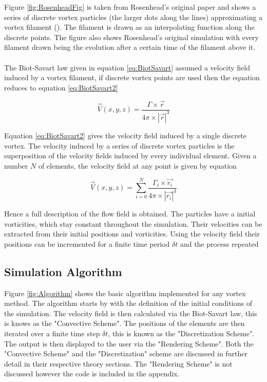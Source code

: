 Figure \ref{fig:RosenheadFig} is taken from Rosenhead's original paper and shows a series of discrete vortex particles (the larger dots along the lines) approximating a vortex filament (\cite{rosenhead_1931}). The filament is drawn as an interpolating function along the discrete points. The figure also shows Rosenhead's original simulation with every filament drawn being the evolution after a certain time of the filament above it. 
\\\\
The Biot-Savart law given in equation \ref{eq:BiotSavart} assumed a velocity field induced by a vortex filament, if discrete vortex points are used then the equation reduces to equation \ref{eq:BiotSavart2}

\begin{equation}
\label{eq:BiotSavart2}
\vec{V}(x,y,z)=\frac{\Gamma \times \vec{r}}{4\pi \times |\vec{r}|^3} 
\end{equation}

Equation \ref{eq:BiotSavart2} gives the velocity field induced by a single discrete vortex. The velocity induced by a series of discrete vortex particles is the superposition of the velocity fields induced by every individual element. Given a number $N$ of elements, the velocity field at any point is given by equation 

\begin{equation}
\label{eq:BiotSavart3}
\vec{V}(x,y,z)=\sum_{i=0}^{N}\frac{\Gamma_i \times \vec{r_i}}{4\pi \times |\vec{r_i}|^3} 
\end{equation}

Hence a full description of the flow field is obtained. The particles have a initial vorticities, which stay constant throughout the simulation. Their velocities can be extracted from their initial positions and vorticities. Using the velocity field their positions can be incremented for a finite time period $\delta t$ and the process repeated

\subsection{Simulation Algorithm}

Figure \ref{fig:Algorithm} shows the basic algorithm implemented for any vortex method. The algorithm starts by with the definition of the initial conditions of the simulation. The velocity field is then calculated via the Biot-Savart law, this is knows as the "Convective Scheme". The positions of the elements are then iterated over a finite time step $\delta t$, this is known as the "Discretization Scheme". The output is then displayed to the user via the "Rendering Scheme". Both the "Convective Scheme" and the "Discretization" scheme are discussed in further detail in their respective theory sections. The "Rendering Scheme" is not discussed however the code is included in the appendix.

